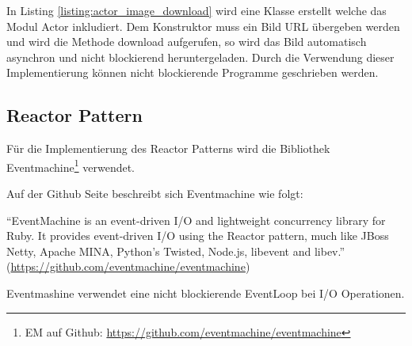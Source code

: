 In Listing \ref{listing:actor_image_download} wird eine Klasse erstellt welche das Modul Actor inkludiert. Dem Konstruktor muss ein Bild URL übergeben werden und wird die Methode download aufgerufen, so wird das Bild automatisch asynchron und nicht blockierend heruntergeladen. Durch die Verwendung dieser Implementierung können nicht blockierende Programme geschrieben werden. 

\subsection{Reactor Pattern}
Für die Implementierung des Reactor Patterns wird die Bibliothek Eventmachine\footnote{EM auf Github: \url{https://github.com/eventmachine/eventmachine}} verwendet. 

Auf der Github Seite beschreibt sich Eventmachine wie folgt: 

	``EventMachine is an event-driven I/O and lightweight concurrency library for Ruby. It provides event-driven I/O using the Reactor pattern, much like JBoss Netty, Apache MINA, Python's Twisted, Node.js, libevent and libev.'' (\url{https://github.com/eventmachine/eventmachine})

Eventmashine verwendet eine nicht blockierende EventLoop bei I/O Operationen.